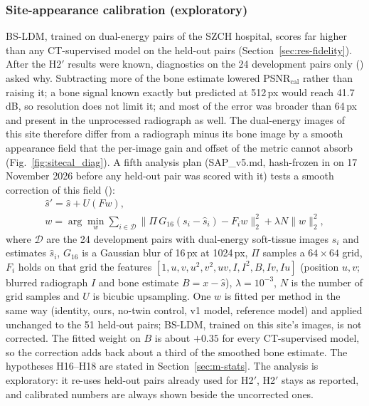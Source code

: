 \subsubsection{Site-appearance calibration (exploratory)}
\label{sec:m-sitecal}
BS-LDM, trained on dual-energy pairs of the SZCH hospital, scores far higher than any CT-supervised model on the held-out pairs
(Section~\ref{sec:res-fidelity}). After the H2$'$ results were known, diagnostics on the 24 development pairs only
() asked why. Subtracting more of the bone estimate lowered PSNR$_{\mathrm{cal}}$ rather than raising it; a bone
signal known exactly but predicted at 512\,px would reach 41.7\,dB, so resolution does not limit it; and most of the error was broader than
64\,px and present in the unprocessed radiograph as well. The dual-energy images of this site therefore differ from a radiograph minus its
bone image by a smooth appearance field that the per-image gain and offset of the metric cannot absorb (Fig.~\ref{fig:sitecal_diag}).
A fifth analysis plan (SAP\_v5.md,
hash-frozen in  on 17 November 2026 before any held-out pair was scored with it) tests a smooth correction of this field
():
\begin{equation}
\begin{gathered}
\hat s'=\hat s+U(F w),\\
w=\arg\min_{w}\sum_{i\in\mathcal{D}}\big\lVert \Pi\,G_{16}(s_i-\hat s_i)-F_i w\big\rVert_2^2+\lambda N\lVert w\rVert_2^2,
\end{gathered}
\label{eq:sitecal}
\end{equation}
where $\mathcal{D}$ are the 24 development pairs with dual-energy soft-tissue images $s_i$ and estimates $\hat s_i$, $G_{16}$ is a Gaussian
blur of 16\,px at 1024\,px, $\Pi$ samples a $64\times64$ grid, $F_i$ holds on that grid the features $[1,u,v,u^2,v^2,uv,I,I^2,B,Iv,Iu]$
(position $u,v$; blurred radiograph $I$ and bone estimate $B=x-\hat s$), $\lambda=10^{-3}$, $N$ is the number of grid samples and $U$ is
bicubic upsampling. One $w$ is fitted per method in the same way (identity, ours, no-twin control, v1 model, reference model) and applied
unchanged to the 51 held-out pairs; BS-LDM, trained on this site's images, is not corrected. The fitted weight on $B$ is about $+0.35$ for
every CT-supervised model, so the correction adds back about a third of the smoothed bone estimate. The hypotheses H16--H18 are stated in
Section~\ref{sec:m-stats}. The analysis is exploratory: it re-uses held-out pairs already used for H2$'$, H2$'$ stays as reported, and
calibrated numbers are always shown beside the uncorrected ones.

